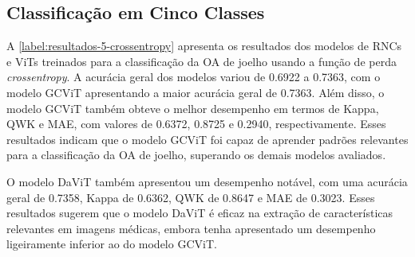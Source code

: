 \subsection{Classificação em Cinco Classes}

A \autoref{label:resultados-5-crossentropy} apresenta os resultados dos modelos de RNCs e ViTs treinados para a classificação da OA de joelho usando a função de perda \textit{crossentropy}. A acurácia geral dos modelos variou de 0.6922 a 0.7363, com o modelo GCViT apresentando a maior acurácia geral de 0.7363. Além disso, o modelo GCViT também obteve o melhor desempenho em termos de Kappa, QWK e MAE, com valores de 0.6372, 0.8725 e 0.2940, respectivamente. Esses resultados indicam que o modelo GCViT foi capaz de aprender padrões relevantes para a classificação da OA de joelho, superando os demais modelos avaliados.

O modelo DaViT também apresentou um desempenho notável, com uma acurácia geral de 0.7358, Kappa de 0.6362, QWK de 0.8647 e MAE de 0.3023. Esses resultados sugerem que o modelo DaViT é eficaz na extração de características relevantes em imagens médicas, embora tenha apresentado um desempenho ligeiramente inferior ao do modelo GCViT.

